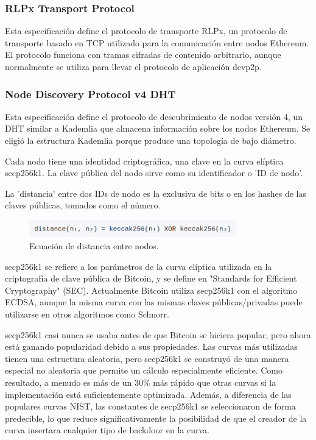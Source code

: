 \subsubsection{RLPx Transport Protocol}
Esta especificación define el protocolo de transporte RLPx, un protocolo de transporte basado en
TCP utilizado para la comunicación entre nodos Ethereum. El protocolo funciona con tramas cifradas
de contenido arbitrario, aunque normalmente se utiliza para llevar el protocolo de aplicación
devp2p.


\subsubsection{Node Discovery Protocol v4 DHT}
Esta especificación define el protocolo de descubrimiento de nodos versión 4, un DHT similar a
Kademlia que almacena información sobre los nodos Ethereum. Se eligió la estructura Kademlia porque
produce una topología de bajo diámetro.

Cada nodo tiene una identidad criptográfica, una clave en la curva elíptica secp256k1. La clave
pública del nodo sirve como su identificador o 'ID de nodo'.

La 'distancia' entre dos IDs de nodo es la exclusiva de bits o en los hashes de las claves
públicas, tomados como el número.

\begin{figure}[htbp!] 
\centering    
\includegraphics[width=0.8\textwidth]{distance-nodes}
\caption[DistanceNodes]{Ecuación de distancia entre nodos.}
\label{fig:distance-nodes}
\end{figure}

secp256k1 se refiere a los parámetros de la curva elíptica utilizada en la criptografía de clave
pública de Bitcoin, y se define en "Standards for Efficient Cryptography" (SEC). Actualmente
Bitcoin utiliza secp256k1 con el algoritmo ECDSA, aunque la misma curva con las mismas claves
públicas/privadas puede utilizarse en otros algoritmos como Schnorr.

secp256k1 casi nunca se usaba antes de que Bitcoin se hiciera popular, pero ahora está ganando
popularidad debido a sus propiedades. Las curvas más utilizadas tienen una estructura aleatoria,
pero secp256k1 se construyó de una manera especial no aleatoria que permite un cálculo
especialmente eficiente. Como resultado, a menudo es más de un 30\% más rápido que otras curvas si
la implementación está suficientemente optimizada. Además, a diferencia de las populares curvas
NIST, las constantes de secp256k1 se seleccionaron de forma predecible, lo que reduce
significativamente la posibilidad de que el creador de la curva insertara cualquier tipo de
backdoor en la curva.

